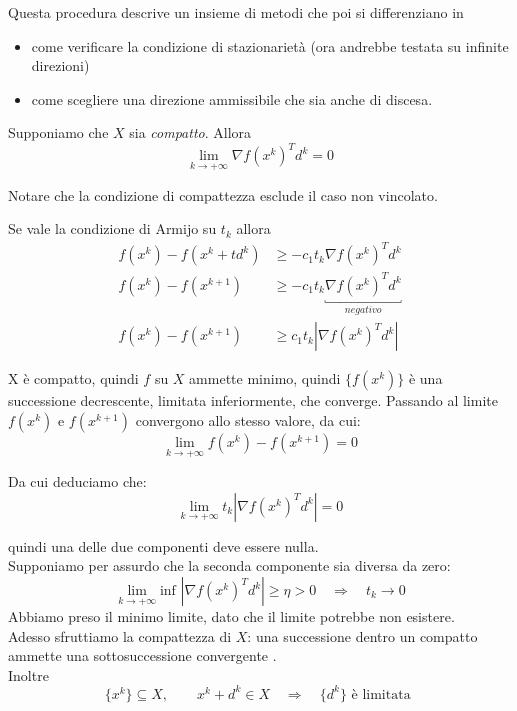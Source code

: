 Questa procedura descrive un insieme di metodi che poi si
differenziano in
\begin{itemize}
\item come verificare la condizione di stazionarietà (ora andrebbe
  testata su infinite direzioni)
\item come scegliere una direzione ammissibile che sia anche di discesa.
\end{itemize}

\begin{property}
  \label{prop:gradiente-compatto}
  Supponiamo che $X$ sia \emph{compatto}. Allora
  $$ \lim_{k \to +\infty} \nabla f(x^{k})^{T}d^{k} = 0 $$
\end{property}
Notare che la condizione di compattezza esclude il caso non vincolato.


\begin{thproof}
  Se vale la condizione di Armijo su $t_k$ allora
  \[\begin{array}{ll}
    f(x^{k}) - f(x^{k}+td^k) &\geq - c_1 t_k \nabla f(x^{k})^{T} d^{k} \\
    f(x^{k}) - f(x^{k+1})    &\geq - c_1 t_k \underbracket{\nabla f(x^{k})^{T} d^{k}}_{negativo}\\
    f(x^{k}) - f(x^{k+1})    &\geq  c_1 t_k | \nabla f(x^{k})^{T} d^{k}|
  \end{array}\]

  X \`e compatto, quindi $f$ su $X$ ammette minimo, quindi
  $\{f(x^{k})\}$ è una successione decrescente, limitata inferiormente,
  che converge. Passando al limite $f(x^k)$ e $f(x^{k+1})$ convergono
  allo stesso valore, da cui:
  $$ \lim_{k \to +\infty}f(x^{k}) - f(x^{k+1}) = 0 $$

  Da cui deduciamo che:
  $$ \lim_{k \to +\infty} t_k | \nabla f(x^{k})^{T}d^{k}| = 0 $$

  quindi una delle due componenti deve essere nulla.\\
  Supponiamo per assurdo che la seconda componente sia diversa da zero:
  $$ \lim_{k \to +\infty}\text{inf } |\nabla f(x^{k})^{T}d^{k}| \geq \eta > 0
  \quad \Rightarrow \quad t_k \to 0 $$
  Abbiamo preso il minimo limite, dato che il limite potrebbe non esistere.\\
  Adesso sfruttiamo la compattezza di $X$: una successione dentro un compatto ammette
  una sottosuccessione convergente .\\
  Inoltre
  $$ \{x^{k}\} \subseteq X, \qquad x^{k} + d^{k} \in X \quad
  \Rightarrow \quad 
  \{ d^{k}\} \text{ \`e limitata }$$


\end{thproof}
